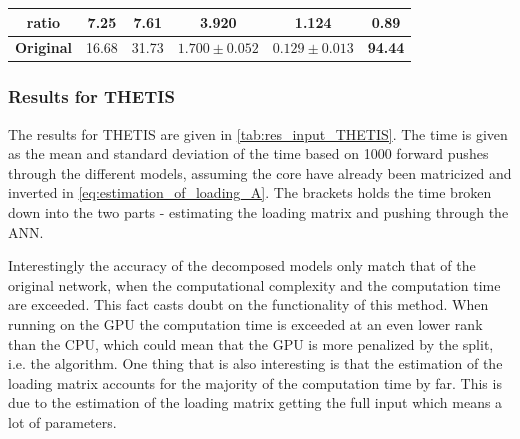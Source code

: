 \begin{table}
\begin{tabular}{c|cccc|c}
ratio             & 7.25                                                              & 7.61                                                         & 3.920                                                                             & 1.124                                                                             & 0.89                                                            \\ \hline
\textbf{Original} & 16.68                                                             & 31.73                                                        & $1.700 \pm 0.052 $                                                                & $0.129 \pm   0.013$                                                               & \textbf{94.44}                                                 
\end{tabular}
\end{table}

\subsubsection{Results for THETIS}
The results for THETIS are given in \autoref{tab:res_input_THETIS}. The time is given as the mean and standard deviation of the time based on 1000 forward pushes through the different models, assuming the core have already been matricized and inverted in \eqref{eq:estimation_of_loading_A}. The brackets holds the time broken down into the two parts - estimating the loading matrix and pushing through the ANN.

Interestingly the accuracy of the decomposed models only match that of the original network, when the computational complexity and the computation time are exceeded. This fact casts doubt on the functionality of this method. When running on the GPU the computation time is exceeded at an even lower rank than the CPU, which could mean that the GPU is more penalized by the split, i.e. the algorithm. One thing that is also interesting is that the estimation of the loading matrix accounts for the majority of the computation time by far. This is due to the estimation of the loading matrix getting the full input which means a lot of parameters.

